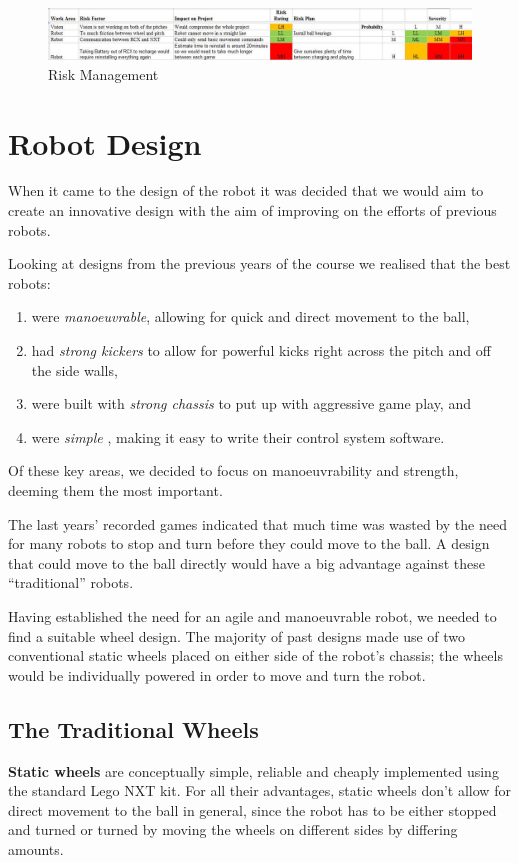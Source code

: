 \documentclass[12pt,a4paper,notitlepage,twocolumn]{report}
\begin{document}
\begin{figure} [ht]
  \centering
  \includegraphics[width=150mm]{riskman.jpg}
  \caption{Risk Management}
  \label{fig:riskman}
\end{figure}



\section*{Robot Design}
When it came to the design of the robot it was decided that we would
aim to create an innovative design with the aim of improving on the
efforts of previous robots.

Looking at designs from the previous years of the course we realised
that the best robots:
\begin{enumerate}
\item were {\em manoeuvrable}, allowing for quick and direct movement
  to the ball,
\item had {\em strong kickers} to allow for powerful kicks right
  across the pitch and off the side walls,
\item were built with {\em strong chassis} to put up with aggressive
  game play, and
\item were {\em simple} , making it easy to write their control system
  software.
\end{enumerate}
Of these key areas, we decided to focus on manoeuvrability and
strength, deeming them the most important.

The last years’ recorded games indicated that much time was wasted by
the need for many robots to stop and turn before they could move to
the ball. A design that could move to the ball directly would have a
big advantage against these “traditional” robots.

Having established the need for an agile and manoeuvrable robot, we
needed to find a suitable wheel design. The majority of past designs
made use of two conventional static wheels placed on either side of
the robot's chassis; the wheels would be individually powered in order
to move and turn the robot.
\subsection*{The Traditional Wheels}
\textbf{Static wheels} are conceptually simple, reliable and cheaply
implemented using the standard Lego NXT kit. For all their advantages,
static wheels don’t allow for direct movement to the ball in general,
since the robot has to be either stopped and turned or turned by
moving the wheels on different sides by differing amounts.
\end{document}
